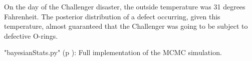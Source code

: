 On the day of the Challenger disaster, the outside temperature was 31 degrees Fahrenheit. The posterior distribution of a defect occurring, given this temperature, almost guaranteed that the Challenger was going to be subject to defective O-rings.

\PyImg "bayesianStats.py" (p \pageref{py:bayesianStats}): Full implementation of the MCMC simulation.

